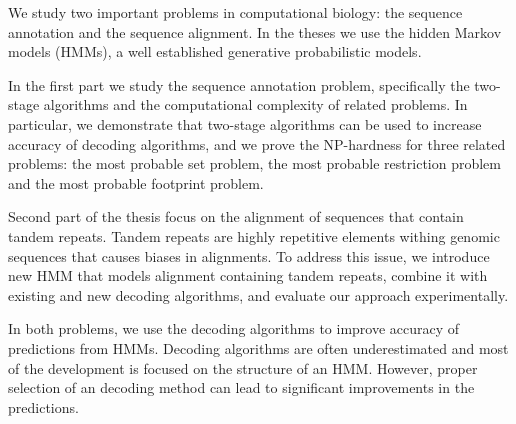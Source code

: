 We study two important problems in computational biology: the sequence
annotation and the sequence alignment. In the theses we use the hidden Markov
models (HMMs), a well established generative probabilistic models.  

In the first part we study the sequence annotation problem, specifically the
two-stage algorithms and the computational complexity of related problems. In
particular, we demonstrate that two-stage algorithms can be used to increase
accuracy of decoding algorithms, and we prove the NP-hardness for three related
problems: the most probable set problem, the most probable restriction problem
and the most probable footprint problem.

Second part of the thesis focus on the alignment of sequences that contain
tandem repeats. Tandem repeats are highly repetitive elements withing genomic
sequences that causes biases in alignments. To address this issue, we introduce
new HMM that models alignment containing tandem repeats, combine it with
existing and new decoding algorithms, and evaluate our approach experimentally.

In both problems, we use the decoding algorithms to improve accuracy of
predictions from HMMs. Decoding algorithms are often underestimated and most of
the development is focused on the structure of an HMM. However, proper
selection of an decoding method can lead to significant improvements in the
predictions.
